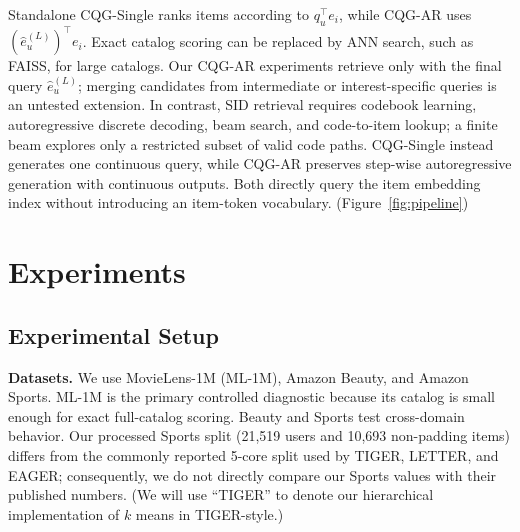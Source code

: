 \documentclass[preprint,12pt]{elsarticle}
\begin{document}
Standalone CQG-Single ranks items according to $q_u^\top e_i$, while CQG-AR uses $(\hat e_u^{(L)})^\top e_i$. Exact catalog scoring can be replaced by ANN search, such as FAISS, for large catalogs. Our CQG-AR experiments retrieve only with the final query \(\hat e_u^{(L)}\); merging candidates from intermediate or interest-specific queries is an untested extension. In contrast, SID retrieval requires codebook learning, autoregressive discrete decoding, beam search, and code-to-item lookup; a finite beam explores only a restricted subset of valid code paths. CQG-Single instead generates one continuous query, while CQG-AR preserves step-wise autoregressive generation with continuous outputs. Both directly query the item embedding index without introducing an item-token vocabulary. (Figure~\ref{fig:pipeline})



\section{Experiments}

\subsection{Experimental Setup}

\textbf{Datasets.}
We use MovieLens-1M (ML-1M), Amazon Beauty, and Amazon Sports. ML-1M is the primary controlled diagnostic because its catalog is small enough for exact full-catalog scoring. Beauty and Sports test cross-domain behavior. Our processed Sports split (21,519 users and 10,693 non-padding items) differs from the commonly reported 5-core split used by TIGER, LETTER, and EAGER; consequently, we do not directly compare our Sports values with their published numbers. (We will use “TIGER” to denote our hierarchical implementation of \(k\) means in TIGER-style.) 
\end{document}
